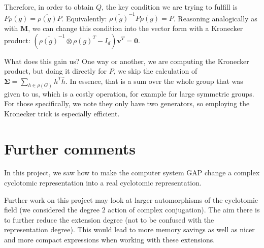 \documentclass[11pt]{article}
\begin{document}
Therefore, in order to obtain $Q$, the key condition we are trying to
fulfill is $P\rho(g) = \overline{\rho(g)}P$. Equivalently:
$\overline{\rho(g)}^{-1}P\rho(g) = P$. Reasoning analogically as with $\mathbf{M}$,
we can change this condition into the vector form with a Kronecker product:
$\left(\overline{\rho(g)}^{-1} \otimes \rho(g)^T - I_d\right)\mathbf{v}^T = \mathbf{0}$.

What does this gain us? One way or another, we are computing the Kronecker product,
but doing it directly for $P$, we skip the calculation of
$\mathbf{\Sigma} = \sum_{h \in \rho(G)} h^T\overline{h}$. In essence, that is a
sum over the whole group that was given to us, which is a costly operation,
for example for large symmetric groups. For those specifically, we note they only
have two generators, so employing the Kronecker trick is especially efficient.

\newpage

\section{Further comments} \label{sec:end}

In this project, we saw how to make the computer system GAP change a complex
cyclotomic representation into a real cyclotomic representation.

Further work on this project may look at larger automorphisms of the cyclotomic
field (we considered the degree $2$ action of complex conjugation). The aim there
is to further reduce the extension degree (not to be confused with the
representation degree). This would lead to more memory savings as well as nicer
and more compact expressions when working with these extensions.
\end{document}

